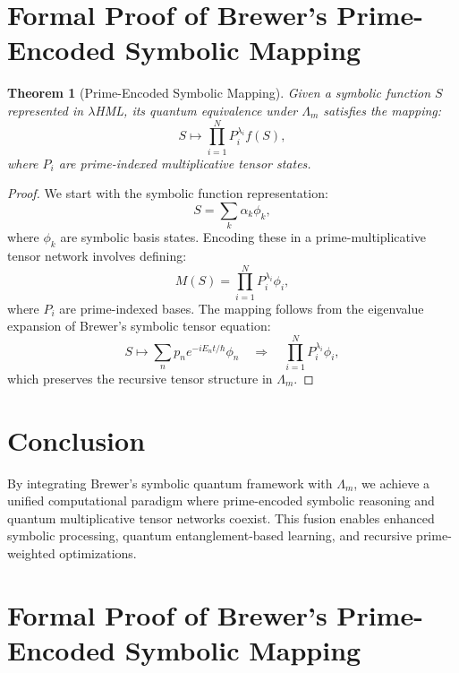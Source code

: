 \documentclass{article}
\theoremstyle{plain}
\newtheorem{theorem}{Theorem}
\begin{document}
\section{Formal Proof of Brewer's Prime-Encoded Symbolic Mapping}
\begin{theorem}[Prime-Encoded Symbolic Mapping]
Given a symbolic function $S$ represented in \(\lambda\)HML, its quantum equivalence under $\Lambda_m$ satisfies the mapping:
\begin{equation}
S \mapsto \prod_{i=1}^{N} P_i^{\lambda_i} f(S),
\end{equation}
where $P_i$ are prime-indexed multiplicative tensor states.
\end{theorem}

\begin{proof}
We start with the symbolic function representation:
\begin{equation}
S = \sum_{k} \alpha_k \phi_k,
\end{equation}
where $\phi_k$ are symbolic basis states. Encoding these in a prime-multiplicative tensor network involves defining:
\begin{equation}
M(S) = \prod_{i=1}^{N} P_i^{\lambda_i} \phi_i,
\end{equation}
where $P_i$ are prime-indexed bases. The mapping follows from the eigenvalue expansion of Brewer’s symbolic tensor equation:
\begin{equation}
S \mapsto \sum_{n} p_n e^{-i E_n t / \hbar} \phi_n \quad \Rightarrow \quad \prod_{i=1}^{N} P_i^{\lambda_i} \phi_i,
\end{equation}
which preserves the recursive tensor structure in $\Lambda_m$.\qedhere
\end{proof}

\section{Conclusion}
By integrating Brewer’s symbolic quantum framework with $\Lambda_m$, we achieve a unified computational paradigm where prime-encoded symbolic reasoning and quantum multiplicative tensor networks coexist. This fusion enables enhanced symbolic processing, quantum entanglement-based learning, and recursive prime-weighted optimizations.

\section{Formal Proof of Brewer’s Prime-Encoded Symbolic Mapping}
\end{document}
